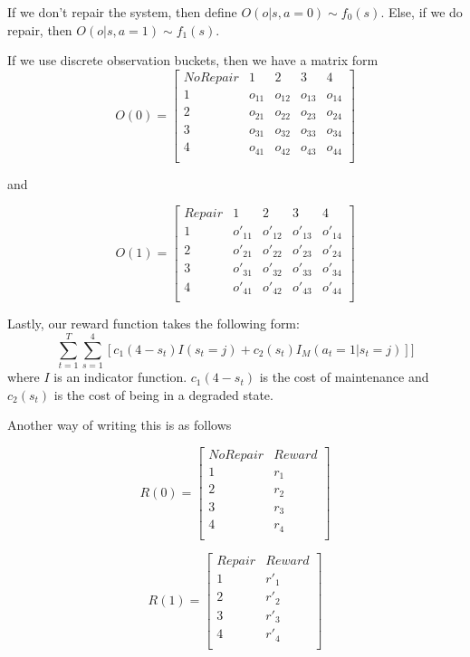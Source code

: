 \documentclass[english]{article}
\numberwithin{equation}{section}
\begin{document}
	If we don't repair the system, then define $O(o|s,a=0) \sim f_0(s)$. Else, if we do repair, then $O(o|s,a=1) \sim f_1(s)$.
	
	If we use discrete observation buckets, then we have a matrix form
	$$    O(0) = 
	\begin{bmatrix}
	No Repair & 1 & 2 & 3 & 4 \\
	1 & o_{11} & o_{12} & o_{13} & o_{14} \\
	2 & o_{21} & o_{22} & o_{23} & o_{24} \\
	3 & o_{31} & o_{32} & o_{33} & o_{34} \\
	4 & o_{41} & o_{42} & o_{43} & o_{44} \\
	\end{bmatrix}
	$$
	
	and
	
	$$    O(1) = 
	\begin{bmatrix}
	Repair & 1 & 2 & 3 & 4 \\
	1 & o'_{11} & o'_{12} & o'_{13} & o'_{14} \\
	2 & o'_{21} & o'_{22} & o'_{23} & o'_{24} \\
	3 & o'_{31} & o'_{32} & o'_{33} & o'_{34} \\
	4 & o'_{41} & o'_{42} & o'_{43} & o'_{44} \\
	\end{bmatrix}
	$$
	
	Lastly, our reward function takes the following form:
	$$\sum_{t=1}^T \sum_{s=1}^4 [c_1(4-s_t)I(s_t=j) + c_2(s_t)I_M(a_t=1|s_t=j)]]$$
	where $I$ is an indicator function. $c_1(4-s_t)$ is the cost of maintenance and $c_2(s_t)$ is the cost of being in a degraded state.
	
	Another way of writing this is as follows
	
	$$
	R(0) = 
	\begin{bmatrix}
	No Repair & Reward \\
	1 & r_1 \\
	2 & r_2 \\
	3 & r_3 \\
	4 & r_4 \\
	\end{bmatrix}
	$$
	
	$$
	R(1) = 
	\begin{bmatrix}
	Repair & Reward \\
	1 & r'_1 \\
	2 & r'_2 \\
	3 & r'_3 \\
	4 & r'_4 \\
	\end{bmatrix}
	$$
	
\end{document}
